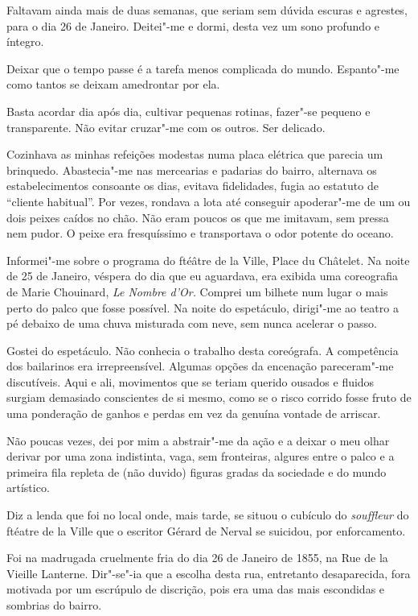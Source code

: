 Faltavam ainda mais de duas semanas, que seriam sem dúvida escuras e
agrestes, para o dia 26 de Janeiro. Deitei"-me e dormi, desta vez um sono
profundo e íntegro.

Deixar que o tempo passe é a tarefa menos complicada do mundo.
Espanto"-me como tantos se deixam amedrontar por ela.

Basta acordar dia após dia, cultivar pequenas rotinas,
fazer"-se pequeno e transparente. Não evitar cruzar"-me com os outros. Ser
delicado.

Cozinhava as minhas refeições modestas numa placa elétrica que
parecia um brinquedo. Abastecia"-me nas mercearias e padarias do bairro,
alternava os estabelecimentos consoante os dias, evitava fidelidades,
fugia ao estatuto de ``cliente habitual''. Por vezes, rondava a lota
até conseguir apoderar"-me de um ou dois peixes caídos no chão. Não eram
poucos os que me imitavam, sem pressa nem pudor. O peixe era
fresquíssimo e transportava o odor potente do oceano.

Informei"-me sobre o programa do ftéâtre de la Ville, Place du Châtelet.
Na noite de 25 de Janeiro, véspera do dia que eu aguardava, era exibida
uma coreografia de Marie Chouinard, \emph{Le Nombre d'Or. }Comprei um
bilhete num lugar o mais perto do palco que fosse possível. Na noite do
espetáculo, dirigi"-me ao teatro a pé debaixo de uma chuva misturada com
neve, sem nunca acelerar o passo.

Gostei do espetáculo. Não conhecia o trabalho desta coreógrafa. A
competência dos bailarinos era irrepreensível. Algumas opções da
encenação pareceram"-me discutíveis. Aqui e ali, movimentos que se teriam
querido ousados e fluidos surgiam demasiado conscientes de si mesmo,
como se o risco corrido fosse fruto de uma ponderação de ganhos e
perdas em vez da genuína vontade de arriscar.

Não poucas vezes, dei por mim a abstrair"-me da ação e a deixar o meu
olhar derivar por uma zona indistinta, vaga, sem fronteiras, algures
entre o palco e a primeira fila repleta de (não duvido) figuras gradas
da sociedade e do mundo artístico.

Diz a lenda que foi no local onde, mais tarde, se situou o cubículo do
\emph{souffleur }do ftéatre de la Ville que o escritor Gérard de Nerval
se suicidou, por enforcamento.

Foi na madrugada cruelmente fria do dia 26 de Janeiro de 1855, na Rue de
la Vieille Lanterne. Dir"-se"-ia que a escolha desta rua, entretanto
desaparecida, fora motivada por um escrúpulo de discrição, pois era uma
das mais escondidas e sombrias do bairro.

